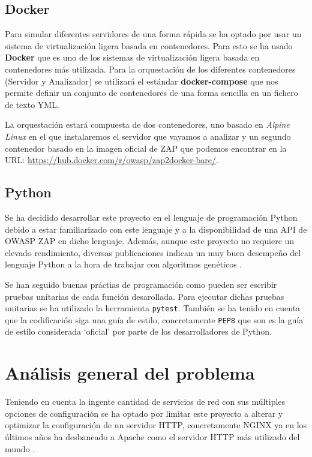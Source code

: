 \subsection{Docker}
Para simular diferentes servidores de una forma rápida se ha optado por usar un sistema de virtualización ligera basada en contenedores. Para esto se ha usado \textbf{Docker} que es uno de los sistemas de virtualización ligera basada en contenedores más utilizada. Para la orquestación de los diferentes contenedores (Servidor y Analizador) se utilizará el estándar \textbf{docker-compose} que nos permite definir un conjunto de contenedores de una forma sencilla en un fichero de texto YML.

\bigskip
La orquestación estará compuesta de dos contenedores, uno basado en \textit{Alpine Linux} en el que instalaremos el servidor que vayamos a analizar y un segundo contenedor basado en la imagen oficial de ZAP que podemos encontrar en la URL: \url{https://hub.docker.com/r/owasp/zap2docker-bare/}.

\subsection{Python}

Se ha decidido desarrollar este proyecto en el lenguaje de programación Python debido a estar familiarizado con este lenguaje y a la disponibilidad de una API de OWASP ZAP en dicho lenguaje. Además, aunque este proyecto no requiere un elevado rendimiento, diversas publicaciones indican un muy buen desempeño del lenguaje Python a la hora de trabajar con algoritmos genéticos \cite{merelo-guervos_comparison_2016}.

\bigskip
Se han seguido buenas práctias de programación como pueden ser escribir pruebas unitarias de cada función desarollada. Para ejecutar dichas pruebas unitarias se ha utilizado la herramienta \texttt{pytest}. También se ha tenido en cuenta que la codificación siga una guía de estilo, concretamente \texttt{PEP8} que son es la guía de estilo considerada `oficial' por parte de los desarrolladores de Python.

\section{Análisis general del problema}

Teniendo en cuenta la ingente cantidad de servicios de red con sus múltiples opciones de configuración se ha optado por limitar este proyecto a alterar y optimizar la configuración de un servidor HTTP, concretamente NGINX ya en los últimos años ha desbancado a Apache como el servidor HTTP  más utilizado del mundo \cite{w3techs_usage_2019}.

